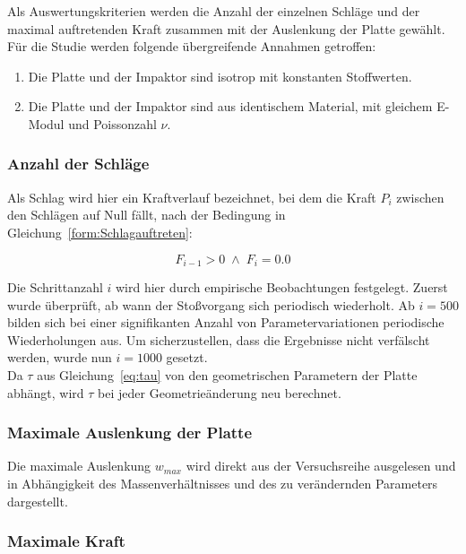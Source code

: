 Als Auswertungskriterien werden die Anzahl der einzelnen Schläge und der maximal auftretenden Kraft zusammen mit der Auslenkung der Platte gewählt. \\
Für die Studie werden folgende übergreifende Annahmen getroffen: 

\begin{enumerate}
	\item{Die Platte und der Impaktor sind isotrop mit konstanten Stoffwerten.}
	\item{Die Platte und der Impaktor sind aus identischem Material, mit gleichem E-Modul und Poissonzahl $\nu$.}
\end{enumerate}

\subsubsection*{Anzahl der Schläge}

Als Schlag wird hier ein Kraftverlauf bezeichnet, bei dem die Kraft $P_{i}$ zwischen den Schlägen auf Null fällt, nach der Bedingung in Gleichung~\ref{form:Schlagauftreten}:

\begin{equation} 
	\label{form:Schlagauftreten}
	F_{i-1} > 0 \; \wedge \; F_{i} = 0.0 
\end{equation}

Die Schrittanzahl $i$ wird hier durch empirische Beobachtungen festgelegt. Zuerst wurde überprüft, ab wann der Stoßvorgang sich periodisch wiederholt. Ab $i = 500$ bilden sich bei einer signifikanten Anzahl von Parametervariationen periodische Wiederholungen aus. Um sicherzustellen, dass die Ergebnisse nicht verfälscht werden, wurde nun $i = 1000$ gesetzt.\\
Da $\tau$ aus Gleichung~\ref{eq:tau} von den geometrischen Parametern der Platte abhängt, wird $\tau$ bei jeder Geometrieänderung neu berechnet.


\subsubsection*{Maximale Auslenkung der Platte}

Die maximale Auslenkung $w_{max}$ wird direkt aus der Versuchsreihe ausgelesen und in Abhängigkeit des Massenverhältnisses und des zu verändernden Parameters dargestellt.

\subsubsection*{Maximale Kraft}

